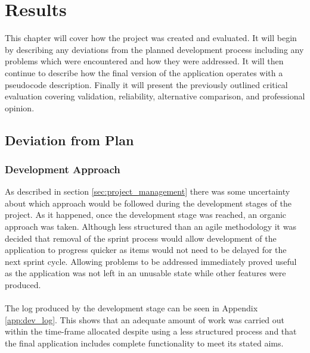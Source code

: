 \section{Results}\label{sec:results}
	This chapter will cover how the project was created and evaluated. It will begin by describing any deviations from the planned development process including any problems which were encountered and how they were addressed. It will then continue to describe how the final version of the application operates with a pseudocode description. Finally it will present the previously outlined critical evaluation covering validation, reliability, alternative comparison, and professional opinion.
	\subsection{Deviation from Plan}
		\subsubsection{Development Approach}
			As described in section \ref{sec:project_management} there was some uncertainty about which approach would be followed during the development stages of the project. As it happened, once the development stage was reached, an organic approach was taken. Although less structured than an agile methodology it was decided that removal of the sprint process would allow development of the application to progress quicker as items would not need to be delayed for the next sprint cycle. Allowing problems to be addressed immediately proved useful as the application was not left in an unusable state while other features were produced.
			\\\\
			The log produced by the development stage can be seen in Appendix \ref{app:dev_log}. This shows that an adequate amount of work was carried out within the time-frame allocated despite using a less structured process and that the final application includes complete functionality to meet its stated aims.
